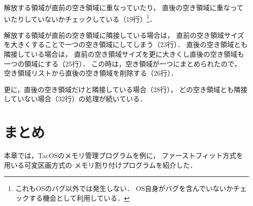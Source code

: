 解放する領域が直前の空き領域に重なっていたり，
直後の空き領域に重なっていたりしていないかチェックしている（19行）\footnote{
  これもOSのバグ以外では発生しない．
  OS自身がバグを含んでいないかチェックする機会として利用している．}．

解放する領域が直前の空き領域に隣接している場合は，
直前の空き領域サイズを大きくすることで一つの空き領域にしてしまう（23行）．
直後の空き領域とも隣接している場合は，
直前の空き領域サイズを更に大きくし直後の空き領域も一つの領域にする（25行）．
この時は，空き領域が一つにまとめられたので，
空き領域リストから直後の空き領域を削除する（26行）．

更に，直後の空き領域だけと隣接している場合（28行），
どの空き領域とも隣接していない場合（32行）の処理が続いている．

\section{まとめ}
本章では，TacOSのメモリ管理プログラムを例に，
ファーストフィット方式を用いる可変区画方式の
メモリ割り付けプログラムを紹介した．
